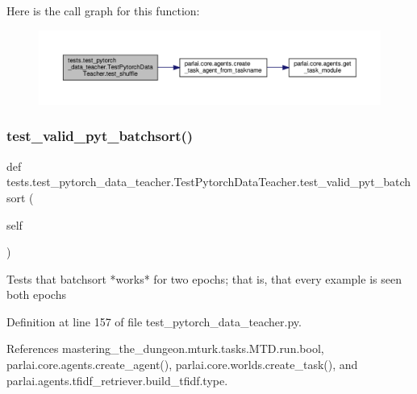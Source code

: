 Here is the call graph for this function\+:
\nopagebreak
\begin{figure}[H]
\begin{center}
\leavevmode
\includegraphics[width=350pt]{classtests_1_1test__pytorch__data__teacher_1_1TestPytorchDataTeacher_aaecd01e211d3e5b0c87f58da6c9b3def_cgraph}
\end{center}
\end{figure}
\mbox{\label{classtests_1_1test__pytorch__data__teacher_1_1TestPytorchDataTeacher_a2c83da3833b551a1e15e6cec4a8589eb}} 
\subsubsection{\texorpdfstring{test\+\_\+valid\+\_\+pyt\+\_\+batchsort()}{test\_valid\_pyt\_batchsort()}}
{\footnotesize\ttfamily def tests.\+test\+\_\+pytorch\+\_\+data\+\_\+teacher.\+Test\+Pytorch\+Data\+Teacher.\+test\+\_\+valid\+\_\+pyt\+\_\+batchsort (\begin{DoxyParamCaption}\item[{}]{self }\end{DoxyParamCaption})}

\begin{DoxyVerb}Tests that batchsort *works* for two epochs; that is, that
every example is seen both epochs
\end{DoxyVerb}
 

Definition at line 157 of file test\+\_\+pytorch\+\_\+data\+\_\+teacher.\+py.



References mastering\+\_\+the\+\_\+dungeon.\+mturk.\+tasks.\+M\+T\+D.\+run.\+bool, parlai.\+core.\+agents.\+create\+\_\+agent(), parlai.\+core.\+worlds.\+create\+\_\+task(), and parlai.\+agents.\+tfidf\+\_\+retriever.\+build\+\_\+tfidf.\+type.

